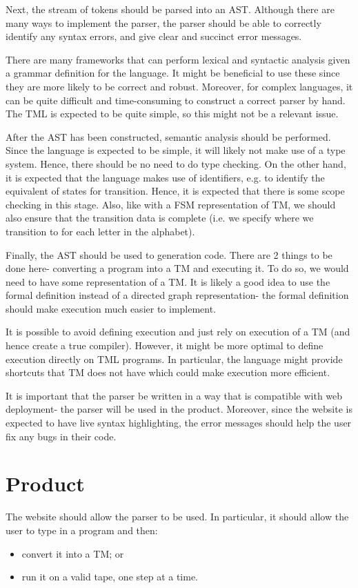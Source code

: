 Next, the stream of tokens should be parsed into an AST. Although there are many ways to implement the parser, the parser should be able to correctly identify any syntax errors, and give clear and succinct error messages.

There are many frameworks that can perform lexical and syntactic analysis given a grammar definition for the language. It might be beneficial to use these since they are more likely to be correct and robust. Moreover, for complex languages, it can be quite difficult and time-consuming to construct a correct parser by hand. The TML is expected to be quite simple, so this might not be a relevant issue.

After the AST has been constructed, semantic analysis should be performed. Since the language is expected to be simple, it will likely not make use of a type system. Hence, there should be no need to do type checking. On the other hand, it is expected that the language makes use of identifiers, e.g. to identify the equivalent of states for transition. Hence, it is expected that there is some scope checking in this stage. Also, like with a FSM representation of TM, we should also ensure that the transition data is complete (i.e. we specify where we transition to for each letter in the alphabet).

Finally, the AST should be used to generation code. There are 2 things to be done here- converting a program into a TM and executing it. To do so, we would need to have some representation of a TM. It is likely a good idea to use the formal definition instead of a directed graph representation- the formal definition should make execution much easier to implement.

It is possible to avoid defining execution and just rely on execution of a TM (and hence create a true compiler). However, it might be more optimal to define execution directly on TML programs. In particular, the language might provide shortcuts that TM does not have which could make execution more efficient.

It is important that the parser be written in a way that is compatible with web deployment- the parser will be used in the product. Moreover, since the website is expected to have live syntax highlighting, the error messages should help the user fix any bugs in their code.

\section{Product}
The website should allow the parser to be used. In particular, it should allow the user to type in a program and then:
\begin{itemize}
    \item convert it into a TM; or
    \item run it on a valid tape, one step at a time.
\end{itemize}

